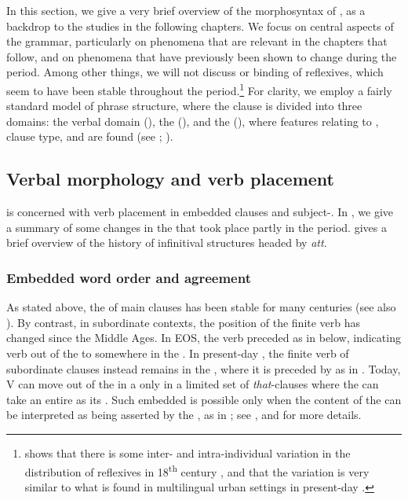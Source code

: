 \documentclass[output=paper]{langscibook}
\begin{document}
In this section, we give a very brief overview of the morphosyntax of , as a backdrop to the studies in the following chapters. We focus on central aspects of the grammar, particularly on phenomena that are relevant in the chapters that follow, and on phenomena that have previously been shown to change during the  period. Among other things, we will not discuss  or binding of reflexives, which seem to have been stable throughout the  period.\footnote{\citet{Tingsell2010} shows that there is some inter- and intra-individual variation in the distribution of reflexives in 18\textsuperscript{th} century , and that the variation is very similar to what is found in multilingual urban settings in present-day .}  For clarity, we employ a fairly standard model of phrase structure, where the clause is divided into three domains: the verbal domain (), the  (), and the  (), where features relating to , clause type, and  are found (see \citealt{Platzack2010}; \citealt{Faarlund2019}). 


\subsection{Verbal morphology and verb placement}\label{sec:intro:3.1}


 is concerned with verb placement in embedded clauses and subject-. In , we give a summary of some changes in the   that took place partly in the  period.  gives a brief overview of the history of  infinitival structures headed by \textit{att}.


\subsubsection{Embedded word order and agreement}\label{sec:intro:3.1.1}


As stated above, the  of  main clauses has been stable for many centuries (see also \citealt{Alving1916}). By contrast, in subordinate contexts, the position of the finite verb has changed since the Middle Ages. In EOS, the verb preceded  as in  below, indicating verb  out of the  to somewhere in the . In present-day , the finite verb of subordinate clauses instead remains in the , where it is preceded by  as in . Today, V can move out of the  in a  only in a limited set of \textit{that}{}-clauses where the  can take an entire  as its . Such embedded   is possible only when the content of the  can be interpreted as being asserted by the , as in ; see \citet{Julien2015},  and  for more details.
\end{document}
